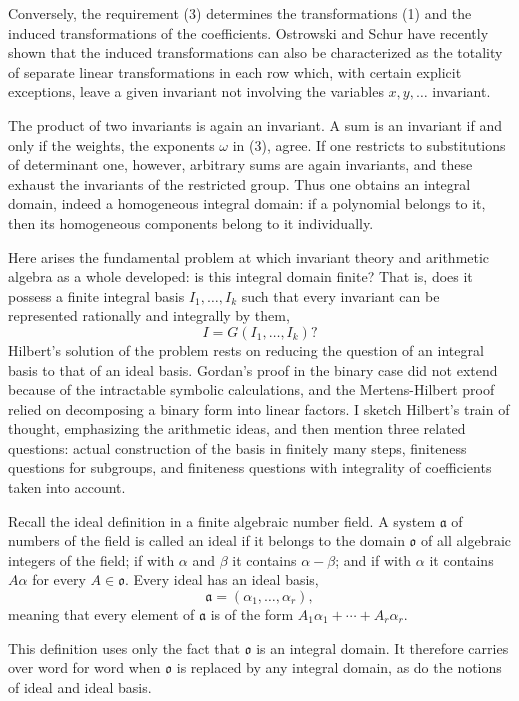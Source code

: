 \documentclass[11pt]{article}
\begin{document}
Conversely, the requirement (3) determines the transformations (1) and the induced transformations of the coefficients. Ostrowski and Schur have recently shown that the induced transformations can also be characterized as the totality of separate linear transformations in each row which, with certain explicit exceptions, leave a given invariant not involving the variables $x,y,\ldots$ invariant.

The product of two invariants is again an invariant. A sum is an invariant if and only if the weights, the exponents $\omega$ in (3), agree. If one restricts to substitutions of determinant one, however, arbitrary sums are again invariants, and these exhaust the invariants of the restricted group. Thus one obtains an integral domain, indeed a homogeneous integral domain: if a polynomial belongs to it, then its homogeneous components belong to it individually.

Here arises the fundamental problem at which invariant theory and arithmetic algebra as a whole developed: is this integral domain finite? That is, does it possess a finite integral basis $I_1,\ldots,I_k$ such that every invariant can be represented rationally and integrally by them,
\[
  I=G(I_1,\ldots,I_k)?
\]
Hilbert's solution of the problem rests on reducing the question of an integral basis to that of an ideal basis. Gordan's proof in the binary case did not extend because of the intractable symbolic calculations, and the Mertens-Hilbert proof relied on decomposing a binary form into linear factors. I sketch Hilbert's train of thought, emphasizing the arithmetic ideas, and then mention three related questions: actual construction of the basis in finitely many steps, finiteness questions for subgroups, and finiteness questions with integrality of coefficients taken into account.

Recall the ideal definition in a finite algebraic number field. A system $\mathfrak a$ of numbers of the field is called an ideal if it belongs to the domain $\mathfrak o$ of all algebraic integers of the field; if with $\alpha$ and $\beta$ it contains $\alpha-\beta$; and if with $\alpha$ it contains $A\alpha$ for every $A\in\mathfrak o$. Every ideal has an ideal basis,
\[
  \mathfrak a=(\alpha_1,\ldots,\alpha_r),
\]
meaning that every element of $\mathfrak a$ is of the form $A_1\alpha_1+\cdots+A_r\alpha_r$.

This definition uses only the fact that $\mathfrak o$ is an integral domain. It therefore carries over word for word when $\mathfrak o$ is replaced by any integral domain, as do the notions of ideal and ideal basis.
\end{document}
